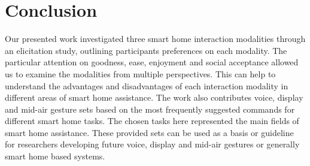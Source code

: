 \documentclass[sigchi]{acmart}
\begin{document}
	\section{Conclusion}
	Our presented work investigated three smart home interaction modalities through an elicitation study, outlining participants preferences on each modality. The particular attention on goodness, ease, enjoyment and social acceptance allowed us to examine the modalities from multiple perspectives. This can help to understand the advantages and disadvantages of each interaction modality in different areas of smart home assistance. The work also contributes voice, display and mid-air gesture sets based on the most frequently suggested commands for different smart home tasks. The chosen tasks here represented the main fields of smart home assistance. These provided sets can be used as a basis or guideline for researchers developing future voice, display and mid-air gestures or generally smart home based systems. 
	
	
	
	
	
\end{document}
